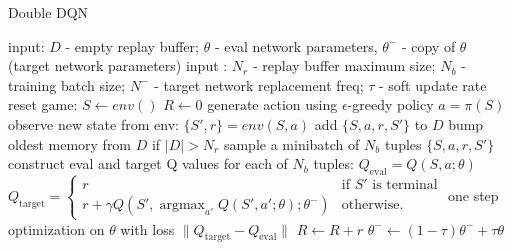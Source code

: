 \documentclass[10pt]{article}
\DeclareMathOperator*{\argmax}{argmax} %
\begin{document}
\begin{algorithm}
\caption{Double DQN}
\begin{algorithmic}
\STATE input: $D$ - empty replay buffer; $\theta$ - eval network parameters, $\theta^-$ - copy of $\theta$ (target network parameters)
\STATE input : $N_r$ - replay buffer maximum size; $N_b$ - training batch size; $N^-$ - target network replacement freq; $\tau$ - soft update rate
\REPEAT
\STATE reset game: $S\leftarrow env()$
\STATE $R\leftarrow 0$
\STATE generate action using $\epsilon$-greedy policy $a=\pi(S)$
\STATE observe new state from env: $\{S',r\} = env(S,a)$
\STATE add $\{S,a,r,S'\}$ to $D$
\STATE bump oldest memory from $D$ if $|D|> N_r$
\STATE sample a minibatch of $N_b$ tuples $\{S,a,r,S'\}$ 
\STATE construct eval and target Q values for each of $N_b$ tuples:
\STATE $Q_{\text{eval}}=Q(S,a;\theta)$
\STATE $Q_{\text{target}}=\left\{
\begin{array}{lr}
             r & \text{if $S'$ is terminal} \\
             r+\gamma Q(S',\argmax_{a'}Q(S',a';\theta);\theta^-) & \text{otherwise.}
\end{array}
\right.
$
\STATE one step optimization on $\theta$ with loss $\lVert Q_{\text{target}}-Q_{\text{eval}}\rVert$
\STATE $R\leftarrow R+r$
\STATE $\theta^- \leftarrow (1-\tau)\theta^- + \tau\theta$
\ENDFOR
{}
\end{algorithmic}
\end{algorithm}
\end{document}
